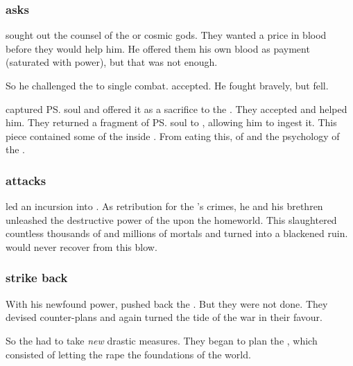 \subsubsection{\Ishnaruchaefir{} asks \xss}
\Ishnaruchaefir{} sought out the counsel of the \xss{} or cosmic gods. 
They wanted a price in blood before they would help him. 
He offered them his own blood as payment (saturated with \xsic{} power), but that was not enough. 

So he challenged the \sathariah{}  to single combat. 
\Quelthah{} accepted. 
He fought bravely, but fell. 

\Ishnaruchaefir{} captured \ps{\Quelthah} soul and offered it as a sacrifice to the \xss. 
They accepted and helped him. 
They returned a fragment of \ps{\Quelthah} soul to \Ishnaruchaefir, allowing him to ingest it. 
This piece contained some of the  inside \Quelthah. 
From eating this, \Ishnaruchaefir{}  of  and the psychology of the \satharioth. 





\subsubsection{\Ishnaruchaefir attacks \Nyx}
\Ishnaruchaefir led an incursion into \Nyx. 
As retribution for the \resphain's crimes, he and his brethren unleashed the destructive power of the \xss upon the \resphan homeworld. 
This slaughtered countless thousands of \resphain and millions of mortals and turned \Nyx into a blackened ruin. 
\Nyx would never recover from this blow. 





\subsubsection{\Resphain{} strike back}
With his newfound power, \Ishnaruchaefir{} pushed back the \resphain.
But they were not done. 
They devised counter-plans and again turned the tide of the war in their favour. 

So the \dragons{} had to take \emph{new} drastic measures. 
They began to plan the , which consisted of letting the \xss{} rape the foundations of the world. 









